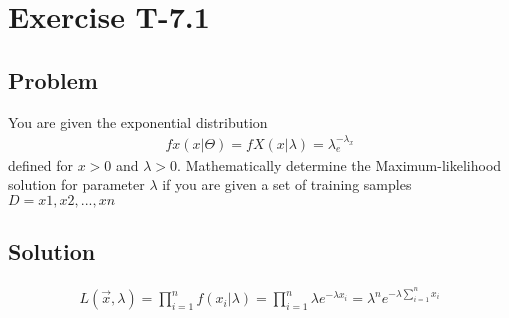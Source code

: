 \section*{Exercise T-7.1}

\subsection*{Problem}
You are given the exponential distribution\\
\begin{align}
fx (x|\Theta) = fX (x|\lambda) = \lambda_e^{−\lambda_x} \nonumber
\end{align}
defined for $x > 0$ and $\lambda > 0$. Mathematically determine the Maximum-likelihood solution for parameter $\lambda$ if you are given a set of training samples $D = x1 , x2 , ..., xn $

\subsection*{Solution}
\begin{align}
L(\overrightarrow{x},\lambda) = \prod_{i=1}^{n}f(x_i | \lambda)=\prod_{i=1}^{n}\lambda e^{-\lambda x_i}=\lambda^n e^{-\lambda \sum_{i=1}^{n} x_i}
\end{align}